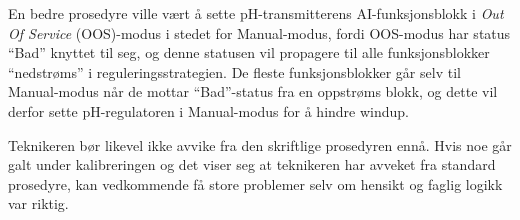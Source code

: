 En bedre prosedyre ville vært å sette pH-transmitterens AI-funksjonsblokk i {\it Out Of Service} (OOS)-modus i stedet for Manual-modus, fordi OOS-modus har status ``Bad'' knyttet til seg, og denne statusen vil propagere til alle funksjonsblokker ``nedstrøms'' i reguleringsstrategien. De fleste funksjonsblokker går selv til Manual-modus når de mottar ``Bad''-status fra en oppstrøms blokk, og dette vil derfor sette pH-regulatoren i Manual-modus for å hindre windup.

Teknikeren bør likevel ikke avvike fra den skriftlige prosedyren ennå. Hvis noe går galt under kalibreringen og det viser seg at teknikeren har avveket fra standard prosedyre, kan vedkommende få store problemer selv om hensikt og faglig logikk var riktig.


